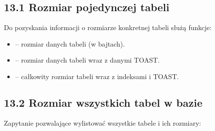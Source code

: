 \documentclass[a4paper,11pt,polish]{sphinxmanual}
\begin{document}
\subsection{13.1 Rozmiar pojedynczej tabeli}
\label{\detokenize{Konfiguracja_baz_danych/Konfiguracja_baz_danych:rozmiar-pojedynczej-tabeli}}
\sphinxAtStartPar
Do pozyskania informacji o rozmiarze konkretnej tabeli służą funkcje:
\begin{itemize}
\item {} 
\sphinxAtStartPar
{} – rozmiar danych tabeli (w bajtach).

\item {} 
\sphinxAtStartPar
{} – rozmiar danych tabeli wraz z danymi TOAST.

\item {} 
\sphinxAtStartPar
{} – całkowity rozmiar tabeli wraz z indeksami i TOAST.

\end{itemize}

\sphinxAtStartPar
{}

\begin{sphinxVerbatim}[commandchars=\\\{\}]
    
    
    
\end{sphinxVerbatim}


\subsection{13.2 Rozmiar wszystkich tabel w bazie}
\label{\detokenize{Konfiguracja_baz_danych/Konfiguracja_baz_danych:rozmiar-wszystkich-tabel-w-bazie}}
\sphinxAtStartPar
Zapytanie pozwalające wylistować wszystkie tabele i ich rozmiary:
\end{document}
